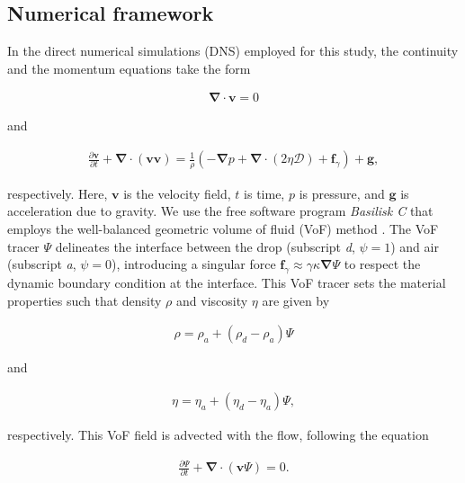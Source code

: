 \documentclass{jfm}
\begin{document}
	\subsection{Numerical framework}
	
	In the direct numerical simulations (DNS) employed for this study, the continuity and the momentum equations take the form
	
	\begin{align}\label{eqn:continuity}
		\boldsymbol{\nabla\cdot v} = 0 
	\end{align}
	
	\noindent and
	
	\begin{align}
		\frac{\partial \boldsymbol{v}}{\partial t} + \boldsymbol{\nabla \cdot}\left(\boldsymbol{vv}\right) = \frac{1}{\rho}\left(-\boldsymbol{\nabla} p + \boldsymbol{\nabla\cdot}\left(2\eta\boldsymbol{\mathcal{D}}\right)  + \boldsymbol{f}_\gamma\right) + \boldsymbol{g},
	\end{align}
	
	\noindent respectively. Here, $\boldsymbol{v}$ is the velocity field, $t$ is time, $p$ is pressure, and $\boldsymbol{g}$ is acceleration due to gravity. We use the free software program \textit{Basilisk C} that employs the well-balanced geometric volume of fluid (VoF) method \citep{popinet2009accurate, popinet2018numerical}. The VoF tracer $\Psi$ delineates the interface between the drop (subscript \textit{d}, $\psi = 1$)  and air (subscript \textit{a}, $\psi = 0$), introducing a singular force $\boldsymbol{f}_\gamma \approx \gamma\kappa\boldsymbol{\nabla}\Psi$ \citep[$\kappa$ denotes interfacial curvature, see][]{brackbill1992continuum} to respect the dynamic boundary condition at the interface. This VoF tracer sets the material properties such that density $\rho$ and viscosity $\eta$ are given by
	
	\begin{align}
		\rho = \rho_a + \left(\rho_d - \rho_a\right)\Psi
	\end{align}
	
	\noindent and
	
	\begin{align}
		\eta = \eta_a + \left(\eta_d - \eta_a\right)\Psi,
	\end{align}
	
	\noindent respectively. This VoF field is advected with the flow, following the equation
	
	\begin{align}\label{eqn:VoF}
		\frac{\partial \Psi}{\partial t} + \boldsymbol{\nabla \cdot}\left(\boldsymbol{v}\Psi\right) = 0.
	\end{align}
	
\end{document}
